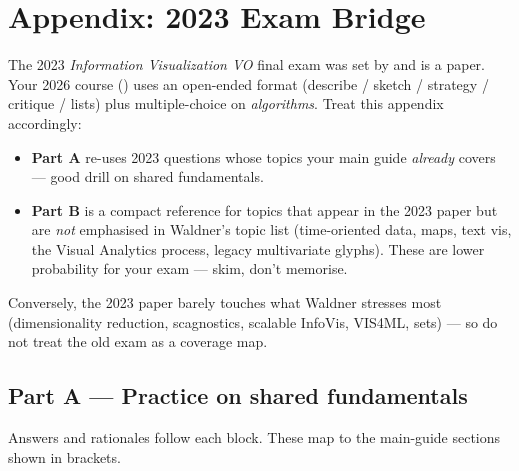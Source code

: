 \section{Appendix: 2023 Exam Bridge}

\begin{exambox}
The 2023 \textit{Information Visualization VO} final exam was set by
 and is a 
paper. Your 2026 course () uses an open-ended format
(describe / sketch / strategy / critique / lists) plus multiple-choice on
\textit{algorithms}. Treat this appendix accordingly:
\begin{itemize}
  \item \textbf{Part A} re-uses 2023 questions whose topics your main guide
        \emph{already} covers --- good drill on shared fundamentals.
  \item \textbf{Part B} is a compact reference for topics that appear in the
        2023 paper but are \emph{not} emphasised in Waldner's topic list
        (time-oriented data, maps, text vis, the Visual Analytics process,
        legacy multivariate glyphs). These are \textcolor{pitred}{lower
        probability} for your exam --- skim, don't memorise.
\end{itemize}
Conversely, the 2023 paper barely touches what Waldner stresses most
(dimensionality reduction, scagnostics, scalable InfoVis, VIS4ML, sets) --- so
do not treat the old exam as a coverage map.
\end{exambox}

\subsection{Part A --- Practice on shared fundamentals}
Answers and rationales follow each block. These map to the main-guide sections
shown in brackets.

